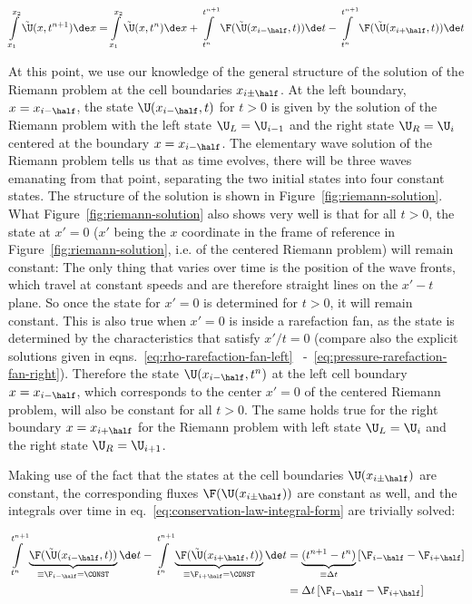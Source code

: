 \begin{align}
 \int\limits_{x_1}^{x_2} \tilde{\U}(x, t^{n+1}) \de x  =
 \int\limits_{x_1}^{x_2} \tilde{\U}(x, t^{n}) \de x  +
 \int\limits_{t^n}^{t^{n+1}} \F(\tilde{\U}(x_{i-\half}, t)) \de t -
 \int\limits_{t^n}^{t^{n+1}} \F(\tilde{\U}(x_{i+\half}, t)) \de t
\label{eq:conservation-law-integral-form}
\end{align}

At this point, we use our knowledge of the general structure of the solution of the Riemann problem
at the cell boundaries $x_{i \pm \half}$. At the left boundary, $x = x_{i-\half}$, the state
$\U(x_{i-\half}, t)$ for $t > 0$ is given by the solution of the Riemann problem with the left
state $\U_L = \U_{i-1}$ and the right state $\U_R = \U_{i}$ centered at the boundary $x =
x_{i-\half}$. The elementary wave solution of the Riemann problem tells us that as time evolves,
there will be three waves emanating from that point, separating the two initial states into four
constant states. The structure of the solution is shown in Figure~\ref{fig:riemann-solution}. What
Figure~\ref{fig:riemann-solution} also shows very well is that for all $t > 0$, the state at $x' =
0$
($x'$ being the $x$ coordinate in the frame of reference in Figure~\ref{fig:riemann-solution}, i.e.
of the centered Riemann problem) will remain constant: The only thing that varies over time is
the position of the wave fronts, which travel at constant speeds and are therefore straight lines on
the $x'-t$ plane. So once the state for $x' = 0$ is determined for $t > 0$, it will remain
constant. This is also true when $x' = 0$ is inside a rarefaction fan, as the state is determined
by the characteristics that satisfy $x'/t = 0$ (compare also the explicit solutions given in
eqns.~\ref{eq:rho-rarefaction-fan-left} ~-~\ref{eq:pressure-rarefaction-fan-right}). Therefore the
state $\U(x_{i-\half}, t^n)$ at the left cell boundary $x = x_{i-\half}$, which corresponds to the
center $x' = 0$ of the centered Riemann problem, will also be constant for all $t > 0$. The same
holds true for the right boundary $x = x_{i+\half}$ for the Riemann problem with left state $\U_L =
\U_i$ and the right state $\U_R = \U_{i+1}$.

Making use of the fact that the states at the cell boundaries $\U(x_{i \pm \half})$ are constant,
the corresponding fluxes $\F(\U(x_{i \pm \half}))$ are constant as well, and the integrals over
time in eq.~\ref{eq:conservation-law-integral-form} are trivially solved:


\begin{align}
 \int\limits_{t^n}^{t^{n+1}} \underbrace{\F(\tilde{\U}(x_{i-\half}, t))}_{\equiv \F_{i-\half}
= \CONST} \de t-
 \int\limits_{t^n}^{t^{n+1}} \underbrace{\F(\tilde{\U}(x_{i+\half}, t))}_{\equiv \F_{i+\half}
= \CONST} \de t &=
 \underbrace{(t^{n+1} - t^n)}_{\equiv \Delta t} \left[ \F_{i-\half} - \F_{i+\half}  \right] \\
 &= \Delta t  \left[ \F_{i-\half} - \F_{i+\half}  \right]
\end{align}

